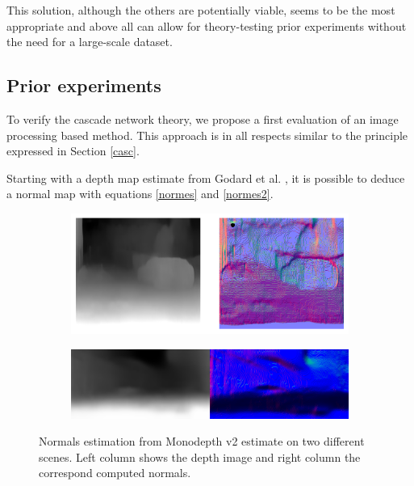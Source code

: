This solution, although the others are potentially viable, seems to be the most appropriate and above all can allow for theory-testing prior experiments without the need for a large-scale dataset.

\subsection{Prior experiments}

To verify the cascade network theory, we propose a first evaluation of an image processing based method. This approach is in all respects similar to the principle expressed in Section \ref{casc}.

Starting with a depth map estimate from Godard et al. \cite{godard2019digging}, it is possible to deduce a normal map with equations \ref{normes} and \ref{normes2}.

\begin{figure}[h]
	\centering
	\begin{subfigure}[b]{.8\linewidth}  
		\centering
		\includegraphics[width=\linewidth]{Figures/Fusion/normals}
	\end{subfigure}

	\begin{subfigure}[b]{.8\linewidth}  
		\centering
		\includegraphics[width=\linewidth]{Figures/Fusion/godnorm}
	\end{subfigure}
	\caption[Normals estimation from Monodepth v2 estimate on two different scenes.]{Normals estimation from Monodepth v2 estimate on two different scenes. Left column shows the depth image and right column the correspond computed normals.}
	\label{fig:godnorm}
\end{figure}

